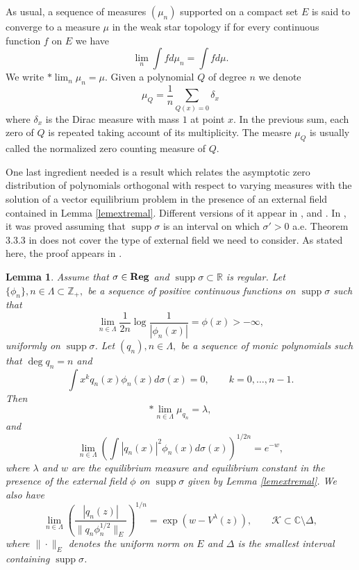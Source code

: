 \documentclass{amsart}
\newtheorem{lemma}{\sc Lemma}[section]
\theoremstyle{definition}
\theoremstyle{remark}
\newcommand{\supp}{\operatorname{supp }}
\begin{document}
\medskip
As usual, a sequence of measures $(\mu_n)$ supported on a compact set $E$ is said to converge to a measure $\mu$ in the weak star topology if for every continuous function $f$ on $E$ we have
\[ \lim_{n} \int f d\mu_n = \int f d \mu.
\]
We write $*\lim_n \mu_n = \mu$. Given a polynomial $Q$ of degree $n$ we denote
\[ \mu_{Q} = \frac{1}{n} \sum_{Q(x) = 0} \delta_x
\]
where $\delta_x$ is the Dirac measure with mass $1$ at point $x$. In the previous sum, each zero of $Q$ is repeated taking account of its multiplicity. The measre $\mu_Q$ is usually called the normalized zero counting measure of $Q$.

One last ingredient needed is a result which relates the asymptotic zero distribution of polynomials orthogonal with respect to varying measures with the solution of a vector equilibrium problem in the presence of an external field contained in Lemma \ref{lemextremal}.  Different
versions of it appear in \cite{gora},  and
\cite{stto}. In \cite{gora}, it was proved assuming that
$\supp{\sigma}$ is an interval on which $\sigma'
> 0$ a.e.  Theorem 3.3.3 in
\cite{stto}  does not cover the type of
external field we need to consider. As stated here, the proof appears in \cite[Lemma 4.2]{FLLS}.




\begin{lemma}\label{gonchar-rakhmanov}
Assume that $\sigma \in \mbox{\bf Reg}$ and $\supp{\sigma} \subset
\mathbb{R}$  is regular.   Let $\{\phi_n\}, n \in \Lambda \subset
\mathbb{Z}_+,$ be a sequence of positive continuous functions on
$\supp{\sigma}$ such that
\begin{equation} \label{eq:phi}
\lim_{n\in \Lambda}\frac{1}{2n}\log\frac{1}{|\phi_n(x)|}= \phi(x)
> -\infty ,
\end{equation}
uniformly on $\supp{\sigma}$. Let  $(q_n), n \in \Lambda,$ be
a sequence of monic polynomials such that $\deg q_n = n$ and
\[
\int x^k q_n(x)\phi_n(x)d\sigma(x)=0,\qquad k=0,\ldots, n-1.
\]
Then
\begin{equation} \label{eq:18}
*\lim_{n \in \Lambda}\mu_{q_n} = \lambda,
\end{equation}
and
\begin{equation} \label{eq:19}
\lim_{n\in \Lambda}\left(\int |q_n(x)|^2\phi_n(x)
d\sigma(x)\right)^{1/{2n}}= e^{-w},
\end{equation}
where $\lambda$ and $w$ are the  equilibrium measure and
equilibrium constant in the presence of the external field $\phi$
on $\supp{\sigma}$ given by Lemma \ref{lemextremal}. We also have
\begin{equation} \label{eq:H}
\lim_{n \in \Lambda} \left(\frac{|q_n(z)|}{\|q_n
\phi_n^{1/2}\|_E}\right)^{1/n} = \exp{(w -
V^{\lambda}(z))}, \qquad  \mathcal{K} \subset  \mathbb{C} \setminus \Delta,
 \end{equation}
 where $\|\cdot\|_E$ denotes the uniform norm on $E$ and $\Delta$ is the smallest interval containing $\supp{\sigma}$.
\end{lemma}
\end{document}
